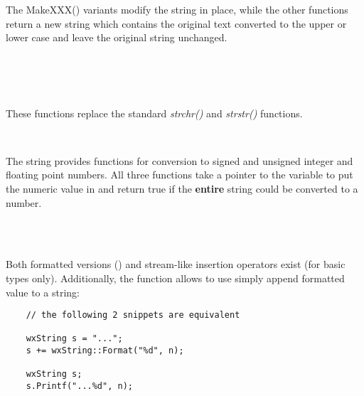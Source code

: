 \label{caseconversioninwxstring}

The MakeXXX() variants modify the string in place, while the other functions
return a new string which contains the original text converted to the upper or
lower case and leave the original string unchanged.

\\
\\
\\

\label{searchingandreplacinginwxstring}

These functions replace the standard {\it strchr()} and {\it strstr()} 
functions.

\\

\label{conversiontonumbersinwxstring}

The string provides functions for conversion to signed and unsigned integer and
floating point numbers. All three functions take a pointer to the variable to
put the numeric value in and return true if the {\bf entire} string could be
converted to a number.

\\
\\

\label{writingintostringinwxstring}

Both formatted versions () and stream-like
insertion operators exist (for basic types only). Additionally, the 
 function allows to use simply append
formatted value to a string:

\begin{verbatim}
    // the following 2 snippets are equivalent

    wxString s = "...";
    s += wxString::Format("%d", n);

    wxString s;
    s.Printf("...%d", n);
\end{verbatim}

\\
\\
\\
\\

